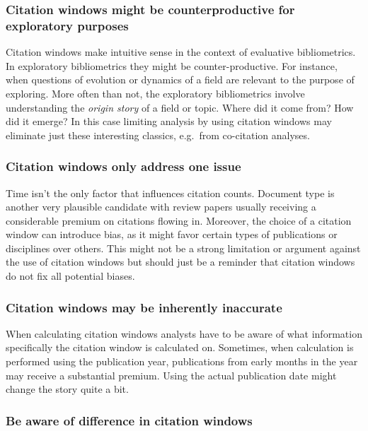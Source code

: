 \documentclass[
  letterpaper,
]{scrreprt}
\begin{document}
\subsubsection{Citation windows might be counterproductive for
exploratory
purposes}\label{citation-windows-might-be-counterproductive-for-exploratory-purposes}

Citation windows make intuitive sense in the context of evaluative
bibliometrics. In exploratory bibliometrics they might be
counter-productive. For instance, when questions of evolution or
dynamics of a field are relevant to the purpose of exploring. More often
than not, the exploratory bibliometrics involve understanding the
\emph{origin story} of a field or topic. Where did it come from? How did
it emerge? In this case limiting analysis by using citation windows may
eliminate just these interesting classics, e.g.~from co-citation
analyses.

\subsubsection{Citation windows only address one
issue}\label{citation-windows-only-address-one-issue}

Time isn't the only factor that influences citation counts. Document
type is another very plausible candidate with review papers usually
receiving a considerable premium on citations flowing in. Moreover, the
choice of a citation window can introduce bias, as it might favor
certain types of publications or disciplines over others. This might not
be a strong limitation or argument against the use of citation windows
but should just be a reminder that citation windows do not fix all
potential biases.

\subsubsection{Citation windows may be inherently
inaccurate}\label{citation-windows-may-be-inherently-inaccurate}

When calculating citation windows analysts have to be aware of what
information specifically the citation window is calculated on.
Sometimes, when calculation is performed using the publication year,
publications from early months in the year may receive a substantial
premium. Using the actual publication date might change the story quite
a bit.

\subsubsection{Be aware of difference in citation
windows}\label{be-aware-of-difference-in-citation-windows}
\end{document}
